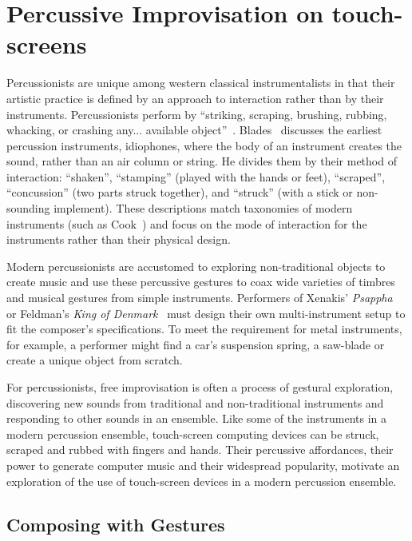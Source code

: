 \documentclass[graybox]{svmult}
\begin{document}
\section{Percussive Improvisation on touch-screens}

Percussionists are unique among western classical instrumentalists in
that their artistic practice is defined by an approach to interaction
rather than by their instruments. Percussionists perform by
``striking, scraping, brushing, rubbing, whacking, or crashing any...
available object''~\cite{Schick:2006fk}. Blades~\cite{Blades:1992kx}
discusses the earliest percussion instruments, idiophones, where the
body of an instrument creates the sound, rather than an air column or
string. He divides them by their method of interaction: ``shaken'',
``stamping'' (played with the hands or feet), ``scraped'',
``concussion'' (two parts struck together), and ``struck'' (with a
stick or non-sounding implement). These descriptions match taxonomies
of modern instruments (such as Cook~\cite{Cook:1997vn}) and focus on
the mode of interaction for the instruments rather than their physical
design.

Modern percussionists are accustomed to exploring non-traditional
objects to create music and use these percussive gestures to coax wide
varieties of timbres and musical gestures from simple instruments.
Performers of Xenakis' \emph{Psappha}~\cite{Xenakis:1975uq} or
Feldman's \emph{King of Denmark}~\cite{Feldman:1965uq} must design
their own multi-instrument setup to fit the composer's specifications.
To meet the requirement for metal instruments, for example, a
performer might find a car's suspension spring, a saw-blade or create
a unique object from scratch.

For percussionists, free improvisation is often a process of gestural
exploration, discovering new sounds from traditional and
non-traditional instruments and responding to other sounds in an
ensemble. Like some of the instruments in a modern percussion
ensemble, touch-screen computing devices can be struck, scraped and
rubbed with fingers and hands. Their percussive affordances, their
power to generate computer music and their widespread popularity,
motivate an exploration of the use of touch-screen devices in a modern
percussion ensemble.

\subsection{Composing with Gestures}
\end{document}
